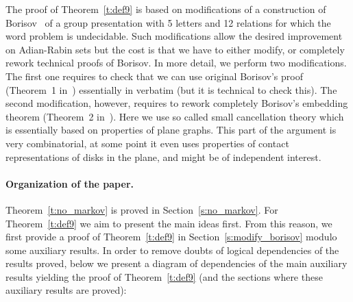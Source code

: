 \documentclass[10pt,a4paper]{article}
\theoremstyle{definition}
\theoremstyle{remark}
\begin{document}
The proof of Theorem~\ref{t:def9} is based on modifications of a construction of
Borisov~\cite{borisov69} of a group presentation with 5 letters and 12
relations for which the word problem is undecidable. Such modifications allow
the desired improvement on Adian-Rabin sets but the cost is that we have
to either modify, or completely rework technical proofs of Borisov. In more
detail, we perform two modifications. The first one requires to check that we
can use original Borisov's proof (Theorem~1 in~\cite{borisov69}) essentially in
verbatim (but it is technical to check this). The second modification, however,
requires to rework completely Borisov's embedding theorem (Theorem~2
in~\cite{borisov69}). Here we use so called small cancellation theory which
is essentially based on properties of plane graphs. This part of the
argument is very combinatorial, at some point it even uses properties of
contact representations of disks in the plane, and might be of independent
interest.

\paragraph{Organization of the paper.} Theorem~\ref{t:no_markov} is proved in
Section~\ref{s:no_markov}. For Theorem~\ref{t:def9} we aim to present the main ideas first. From this
reason, we first provide a proof of Theorem~\ref{t:def9} in
Section~\ref{s:modify_borisov} modulo some
auxiliary results. 
In order to
remove doubts of logical dependencies of the results proved, below we present
a diagram of dependencies of the main auxiliary results yielding the proof of
Theorem~\ref{t:def9} (and the sections where these auxiliary results are proved):


\end{document}
